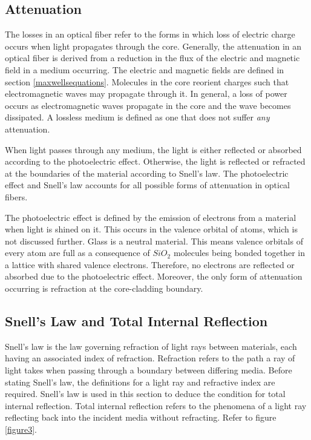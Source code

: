 \documentclass[12pt]{article}
\theoremstyle{definition}
\numberwithin{equation}{section}
\begin{document}
\subsection{Attenuation}\label{attenuation.sec}
The losses in an optical fiber refer to the forms in which loss of electric charge occurs when light propagates through the core. Generally, the attenuation in an optical fiber is derived from a reduction in the flux of the electric and magnetic field in a medium occurring. The electric and magnetic fields are defined in section \ref{maxwellsequations}. Molecules in the core reorient charges such that electromagnetic waves may propagate through it. In general, a loss of power occurs as electromagnetic waves propagate in the core and the wave becomes dissipated. A lossless medium is defined as one that does not suffer \textit{any} attenuation.

When light passes through any medium, the light is either reflected or absorbed according to the photoelectric effect. Otherwise, the light is reflected or refracted at the boundaries of the material according to Snell's law. The photoelectric effect and Snell's law accounts for all possible forms of attenuation in optical fibers.

The photoelectric effect is defined by the emission of electrons from a material when light is shined on it. This occurs in the valence orbital of atoms, which is not discussed further. Glass is a neutral material. This means valence orbitals of every atom are full as a consequence of $SiO_2$ molecules being bonded together in a lattice with shared valence electrons. Therefore, no electrons are reflected or absorbed due to the photoelectric effect. Moreover, the only form of attenuation occurring is refraction at the core-cladding boundary.
\subsection{Snell's Law and Total Internal Reflection}
Snell's law is the law governing refraction of light rays between materials, each having an associated index of refraction. Refraction refers to the path a ray of light takes when passing through a boundary between differing media. Before stating Snell's law, the definitions for a light ray and refractive index are required. Snell's law is used in this section to deduce the condition for total internal reflection. Total internal reflection refers to the phenomena of a light ray reflecting back into the incident media without refracting. Refer to figure \ref{figure3}. 
\end{document}
